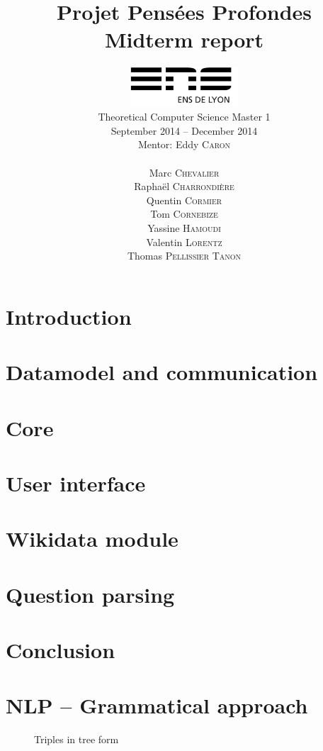 \documentclass[a4paper,10pt]{report}
\title{Projet Pensées Profondes\\\large Midterm report}
\author{\includegraphics[width=0.3\textwidth]{../logo_ensl.pdf}\\[50pt]
Theoretical Computer Science Master 1\\September 2014 \--- December 2014\\[50pt]
Mentor: Eddy \textsc{Caron}\\[50pt]
\begin{minipage}{0.4\textwidth}
    \begin{flushleft} \large
        Marc \textsc{Chevalier}
        \\
        Raphaël \textsc{Charrondière}
        \\
        Quentin \textsc{Cormier}
        \\
        Tom \textsc{Cornebize}
    \end{flushleft}
\end{minipage}
\begin{minipage}{0.4\textwidth}
    \begin{flushright} \large
        Yassine \textsc{Hamoudi}
        \\
        Valentin \textsc{Lorentz}
        \\
        Thomas \textsc{Pellissier Tanon}
        \\
    \end{flushright}
\end{minipage}
}
\date{}
\begin{document}
\maketitle



\tableofcontents

\chapter*{Introduction}


\chapter{Datamodel and communication}


\chapter{Core}


\chapter{User interface}


\chapter{Wikidata module}


\chapter{Question parsing}





\chapter*{Conclusion}


\appendix



\nocite{*}

\chapter{NLP \--- Grammatical approach}

\begin{figure}
\caption{Triples in tree form}
\label{triple_tree}

\end{figure}
\end{document}

